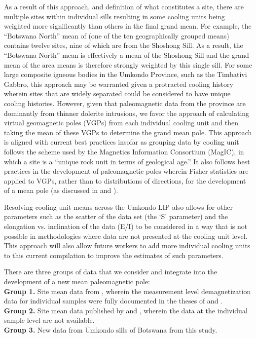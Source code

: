 \documentclass[11pt,letterpaper]{article}
\begin{document}
As a result of this approach, and definition of what constitutes a site, there are multiple sites within individual sills resulting in some cooling units being weighted more significantly than others in the final grand mean. For example, the ``Botswana North'' mean of \cite{Gose2006a} (one of the ten geographically grouped means) contains twelve sites, nine of which are from the Shoshong Sill. As a result, the ``Botswana North''  mean is effectively a mean of the Shoshong Sill and the grand mean of the area means is therefore strongly weighted by this single sill. For some large composite igneous bodies in the Umkondo Province, such as the Timbativi Gabbro, this approach may be warranted given a protracted cooling history wherein sites that are widely separated could be considered to have unique cooling histories. However, given that paleomagnetic data from the province are dominantly from thinner dolerite intrusions, we favor the approach of calculating virtual geomagnetic poles (VGPs) from each individual cooling unit and then taking the mean of these VGPs to determine the grand mean pole. This approach is aligned with current best practices insofar as grouping data by cooling unit follows the scheme used by the Magnetics Information Consortium (MagIC), in which a site is a ``unique rock unit in terms of geological age.'' It also follows best practices in the development of paleomagnetic poles wherein Fisher statistics are applied to VGPs, rather than to distributions of directions, for the development of a mean pole (as discussed in \cite{Tauxe2004a} and \cite{Deenen2011a}).

Resolving cooling unit means across the Umkondo LIP also allows for other parameters such as the scatter of the data set (the `S' parameter) and the elongation vs. inclination of the data (E/I) to be considered in a way that is not possible in methodologies where data are not presented at the cooling unit level. This approach will also allow future workers to add more individual cooling units to this current compilation to improve the estimates of such parameters.

There are three groups of data that we consider and integrate into the development of a new mean paleomagnetic pole:\\

\noindent\textbf{Group 1.} Site mean data from \cite{Gose2006a}, wherein the measurement level demagnetization data for individual samples were fully documented in the theses of \cite{Pancake2001a} and \cite{Seidel2004a}.\\
\noindent\textbf{Group 2.} Site mean data published by \cite{McElhinny1964b} and \cite{Jones1966a}, wherein the data at the individual sample level are not available. \\
\noindent\textbf{Group 3.} New data from Umkondo sills of Botswana from this study.
\end{document}

